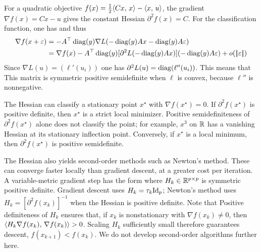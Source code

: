 For a quadratic objective $f(x)=\frac12\langle Cx,\,x\rangle-\langle x,\,u\rangle$, the gradient $\nabla f(x) = Cx-u$ gives the constant Hessian $\partial^2 f(x) = C$.
%
For the classification function, one has 
and thus
\begin{align*}
	\nabla f(x+\varepsilon) &= -A^\top \operatorname{diag}(y) \nabla L( -\operatorname{diag}(y) Ax-\operatorname{diag}(y)A\varepsilon)  \\
		&= \nabla f(x)  -A^\top \operatorname{diag}(y) [\partial^2 L( -\operatorname{diag}(y) Ax)]( -\operatorname{diag}(y) A\varepsilon) + o(|\!| \varepsilon |\!|)
\end{align*}
Since $\nabla L(u) = (\ell'(u_i))$ one has $\partial^2 L(u)=\operatorname{diag}(\ell''(u_i))$. This means that 
This matrix is symmetric positive semidefinite when $\ell$ is convex, because $\ell''$ is nonnegative.

\begin{rem}
The Hessian can classify a stationary point $x^\star$ with $\nabla f(x^\star)=0$. If $\partial^2 f(x^\star)$ is positive definite, then $x^\star$ is a strict local minimizer.
%
Positive semidefiniteness of $\partial^2 f(x^\star)$ alone does not classify the point; for example, $x^3$ on $\mathbb{R}$ has a vanishing Hessian at its stationary inflection point.
%
Conversely, if $x^\star$ is a local minimum, then $\partial^2 f(x^\star)$ is positive semidefinite.
\end{rem}

\begin{rem}
The Hessian also yields second-order methods such as Newton's method. These can converge faster locally than gradient descent, at a greater cost per iteration. A variable-metric gradient step has the form
where $H_k \in \mathbb{R}^{p \times p}$ is symmetric positive definite. Gradient descent uses $H_k=\tau_k \mathrm{Id}_p$; Newton's method uses $H_k=[\partial^2 f(x_k)]^{-1}$ when the Hessian is positive definite.
%
Note that
Positive definiteness of $H_k$ ensures that, if $x_k$ is nonstationary with $\nabla f(x_k)\neq0$, then $\langle H_k \nabla f(x_k),\,\nabla f(x_k)\rangle>0$.
%
Scaling $H_k$ sufficiently small therefore guarantees descent, $f(x_{k+1}) < f(x_k)$.
%
We do not develop second-order algorithms further here.
\end{rem}

